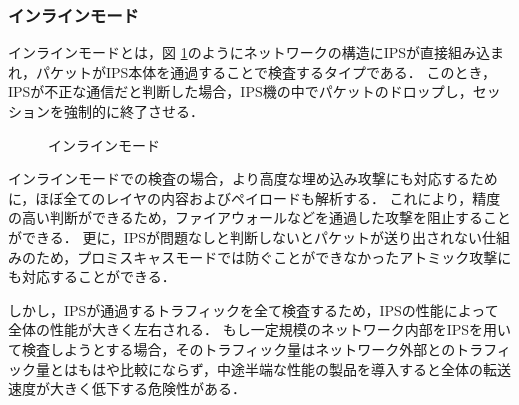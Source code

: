 \subsubsection{インラインモード}

インラインモードとは，図 \ref{fig:2-2}のようにネットワークの構造にIPSが直接組み込まれ，パケットがIPS本体を通過することで検査するタイプである\cite{ciscoips}．
このとき，IPSが不正な通信だと判断した場合，IPS機の中でパケットのドロップし，セッションを強制的に終了させる．

\begin{figure}[tb]
	\begin{center}
		\caption{インラインモード}
		\label{fig:2-2}
	\end{center}
\end{figure}

インラインモードでの検査の場合，より高度な埋め込み攻撃にも対応するために，ほぼ全てのレイヤの内容およびペイロードも解析する．
これにより，精度の高い判断ができるため，ファイアウォールなどを通過した攻撃を阻止することができる．
更に，IPSが問題なしと判断しないとパケットが送り出されない仕組みのため，プロミスキャスモードでは防ぐことができなかったアトミック攻撃にも対応することができる．

しかし，IPSが通過するトラフィックを全て検査するため，IPSの性能によって全体の性能が大きく左右される．
もし一定規模のネットワーク内部をIPSを用いて検査しようとする場合，そのトラフィック量はネットワーク外部とのトラフィック量とはもはや比較にならず，中途半端な性能の製品を導入すると全体の転送速度が大きく低下する危険性がある．